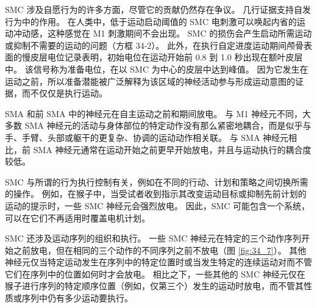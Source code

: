SMC 涉及自愿行为的许多方面，尽管它的贡献仍然存在争议。
几行证据支持自发行为中的作用。
在人类中，低于运动启动阈值的 SMC 电刺激可以唤起内省的运动冲动感，这种感觉在 M1 刺激期间不会出现。
SMC 的损伤会产生启动所需运动或抑制不需要的运动的问题（方框 34-2）。
此外，在执行自定进度运动期间颅骨表面的慢皮层电位记录表明，初始电位在运动开始前 0.8 到 1.0 秒出现在额叶皮层中。
该信号称为准备电位，在以 SMC 为中心的皮层中达到峰值。
因为它发生在运动之前，所以准备潜能被广泛解释为该区域的神经活动参与形成运动意图的证据，而不仅仅是执行运动。


SMA 和前 SMA 中的神经元在自主运动之前和期间放电。
与 M1 神经元不同，大多数 SMA 神经元的活动与身体部位的特定动作没有那么紧密地耦合，而是似乎与手、手臂、头部或躯干的更复杂、协调的运动动作相关联。
与 SMA 神经元相比，前 SMA 神经元通常在运动开始之前更早开始放电，并且与运动执行的耦合度较低。


SMC 与所谓的行为执行控制有关，例如在不同的行动、计划和策略之间切换所需的操作。
例如，在猴子中，当受试者收到指示其改变运动目标或抑制先前计划的运动的提示时，一些 SMC 神经元会强烈放电。
因此，SMC 可能包含一个系统，可以在它们不再适用时覆盖电机计划。


SMC 还涉及运动序列的组织和执行。
一些 SMC 神经元在特定的三个动作序列开始之前放电，但在相同的三个动作的不同序列之前不放电（图 \ref{fig:34_7}）。
其他神经元仅当特定运动发生在序列中的特定位置时或当发生特定的连续运动对而不管它们在序列中的位置如何时才会放电。
相比之下，一些其他的 SMC 神经元仅在猴子进行序列的特定顺序位置（例如，仅第三个）发生的运动时放电，而不管其性质或序列中仍有多少运动要执行。


